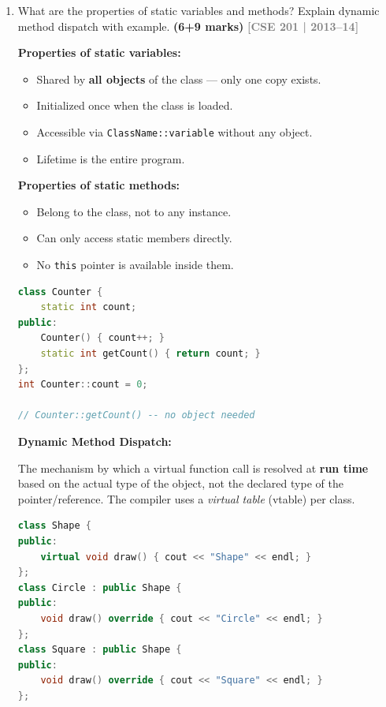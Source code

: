 \documentclass[12pt,a3paper]{article}
\newcommand{\yr}[1]{\hfill\textcolor{gray}{\small\textbf{[#1]}}}
\newcommand{\mk}[1]{\textcolor{orange!70!black}{\small\textbf{(#1 marks)}}}
\begin{document}
\begin{enumerate}
\begin{tcolorbox}[enhanced,breakable,ansbox,colback=cB!4,colframe=cB,
  boxrule=0.8pt,arc=5pt,
  title={\textbf{Answer}},fonttitle=\bfseries\color{white},colbacktitle=cB]
\end{tcolorbox}

\item What are the properties of static variables and methods? Explain dynamic method dispatch with example. \mk{6+9}
\yr{CSE 201 | 2013--14}

\begin{tcolorbox}[enhanced,breakable,ansbox,
  colback=cB!4,colframe=cB,boxrule=0.8pt,arc=5pt,
  title={\textbf{Answer --- Static Variables/Methods and Dynamic Method Dispatch}},
  fonttitle=\bfseries\color{white},colbacktitle=cB]

\textbf{Properties of static variables:}
\begin{itemize}[itemsep=2pt]
  \item Shared by \textbf{all objects} of the class --- only one copy exists.
  \item Initialized once when the class is loaded.
  \item Accessible via \texttt{ClassName::variable} without any object.
  \item Lifetime is the entire program.
\end{itemize}

\textbf{Properties of static methods:}
\begin{itemize}[itemsep=2pt]
  \item Belong to the class, not to any instance.
  \item Can only access static members directly.
  \item No \texttt{this} pointer is available inside them.
\end{itemize}

\begin{lstlisting}[language=C++]
class Counter {
    static int count;
public:
    Counter() { count++; }
    static int getCount() { return count; }
};
int Counter::count = 0;

// Counter::getCount() -- no object needed
\end{lstlisting}

\textbf{Dynamic Method Dispatch:}

The mechanism by which a virtual function call is resolved at
\textbf{run time} based on the actual type of the object, not the
declared type of the pointer/reference. The compiler uses a
\emph{virtual table} (vtable) per class.

\begin{lstlisting}[language=C++]
class Shape {
public:
    virtual void draw() { cout << "Shape" << endl; }
};
class Circle : public Shape {
public:
    void draw() override { cout << "Circle" << endl; }
};
class Square : public Shape {
public:
    void draw() override { cout << "Square" << endl; }
};


\end{lstlisting}
\end{tcolorbox}
\end{enumerate}
\end{document}
